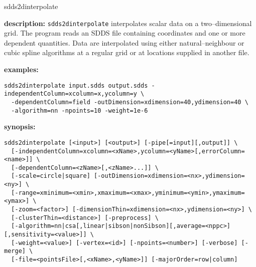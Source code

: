 \begin{sddsprog}{sdds2dinterpolate}
  \item \textbf{description:}
    \verb|sdds2dinterpolate| interpolates scalar data on a two--dimensional grid. The program reads an SDDS file containing coordinates and one or more dependent quantities. Data are interpolated using either natural--neighbour or cubic spline algorithms at a regular grid or at locations supplied in another file.

  \item \textbf{examples:}
  \begin{verbatim}
sdds2dinterpolate input.sdds output.sdds -independentColumn=xcolumn=x,ycolumn=y \
  -dependentColumn=field -outDimension=xdimension=40,ydimension=40 \
  -algorithm=nn -npoints=10 -weight=1e-6
  \end{verbatim}

  \item \textbf{synopsis:}
  \begin{verbatim}
sdds2dinterpolate [<input>] [<output>] [-pipe[=input][,output]] \
  [-independentColumn=xcolumn=<xName>,ycolumn=<yName>[,errorColumn=<name>]] \
  [-dependentColumn=<zName>[,<zName>...]] \
  [-scale=circle|square] [-outDimension=xdimension=<nx>,ydimension=<ny>] \
  [-range=xminimum=<xmin>,xmaximum=<xmax>,yminimum=<ymin>,ymaximum=<ymax>] \
  [-zoom=<factor>] [-dimensionThin=xdimension=<nx>,ydimension=<ny>] \
  [-clusterThin=<distance>] [-preprocess] \
  [-algorithm=nn|csa[,linear|sibson|nonSibson][,average=<nppc>][,sensitivity=<value>]] \
  [-weight=<value>] [-vertex=<id>] [-npoints=<number>] [-verbose] [-merge] \
  [-file=<pointsFile>[,<xName>,<yName>]] [-majorOrder=row|column]
  \end{verbatim}


\end{sddsprog}
